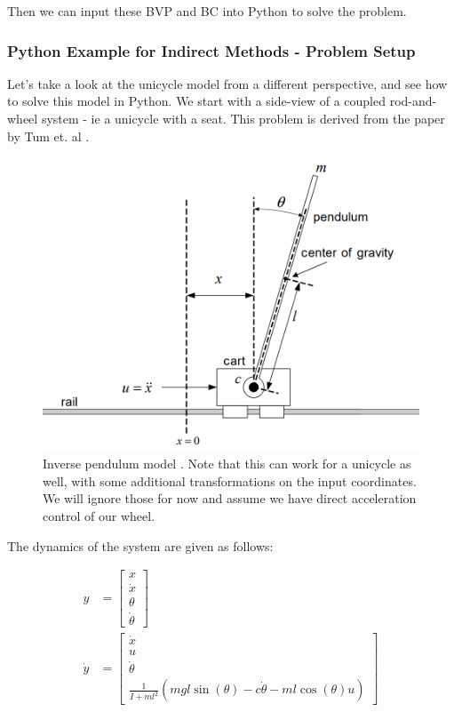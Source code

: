 ﻿\documentclass[twoside]{article}
\begin{document}
Then we can input these BVP and BC into Python to solve the problem.

\subsubsection{Python Example for Indirect Methods - Problem Setup}

Let's take a look at the unicycle model from a different perspective, and see how to solve this model in Python. We start with a side-view of a coupled rod-and-wheel system - ie a unicycle with a seat. This problem is derived from the paper by Tum et. al \cite{inverse_pendulum}.

\begin{figure}[h!]
    \centering
    \includegraphics[width = \textwidth]{inverse_pendulum.png}
    \caption{Inverse pendulum model \cite{inverse_pendulum}. Note that this can work for a unicycle as well, with some additional transformations on the input coordinates. We will ignore those for now and assume we have direct acceleration control of our wheel.}
\end{figure}

The dynamics of the system \cite{inverse_pendulum} are given as follows:

\begin{align*}
    y &= \begin{bmatrix} x \\ \dot{x} \\ \theta \\ \dot{\theta} \end{bmatrix}\\
    \dot{y} &= \begin{bmatrix}
        \dot{x} \\ u \\ \dot{\theta} \\
        \frac{1}{I+ml^2}(mgl\sin(\theta) - c\dot{\theta}-ml\cos(\theta)u)
    \end{bmatrix}
\end{align*}
\end{document}
